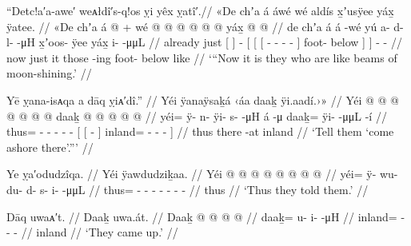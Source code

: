 \ex\label{ex:89-84-them-like-moonbeams}%
%
\begingl
	\glpreamble	“Detc!a′a-awe′ weᴀłdî′s-q!os ỵi yêx ỵatî′.//
	\glpreamble	«\!De chʼa á áwé wé aldís x̱ʼusÿee yáx̱ ÿatee. //
	\gla	«\!De chʼa {} á {}  @ {} +
		{} {} wé {}  @ {} @ {} @ {} @ {} @ {} {}
			 @ {} {} yáx̱ {}
		 @ {} @ {} //
	\glb	\pqp{}de chʼa {} á {} á -wé
		{} {} yú {} a- d- l-  -μH {} {}
			x̱ʼoos- ÿee {} yáx̱ {}
		i-  -μμL //
	\glc	\pqp{}already just {}[  {}]  -
		{}[ {}[  {}[ - - -  - \· {}]
			foot- below {}]  {}]
		-  - //
	\gld	\pqp{}now just {} it {}  {}
		{} {} those {}  {} {} {} {} -ing {}
			foot- below {} like {}
		 {} {} //
	\glft	‘“Now it is they who are like beams of moon-shining.’
		//
\endgl
\xe

\ex\label{ex:89-85-them-like-moonbeams}%
%
\begingl
	\glpreamble	Yē ỵana-isᴀqa a dāq ỵiᴀ′dî.” //
	\glpreamble	Yéi ÿanaÿsaḵá ‹\!áa daaḵ ÿi.aadí.\!›\!» //
	\gla	Yéi @  @ {} @ {} @ {} @ {} @ {}
		{} {}  @ {} {} daaḵ @  @ {} @ {} @ {} @ {} {} //
	\glb	yéi= ÿ- n- ÿi- s-  -μH
		{} {} á -μ {}
			daaḵ= ÿi-  -μμL -í {} //
	\glc	thus= - - - -  -
		{}[ {}[  - {}]
			inland= \· -  - - {}] //
	\gld	thus  {} {} {} {} {}
		{} {} there -at {}
			inland  {} {} {} {} {} //
	\glft	‘Tell them ‘come ashore there’.”’
		//
\endgl
\xe

\ex\label{ex:89-86-thus-they-told-them}%
%
\begingl
	\glpreamble	Ye ỵa′odudzîqa. //
	\glpreamble	Yéi ÿawdudziḵaa. //
	\gla	Yéi @  @ {} @ {} @ {} @ {} @ {} @ {} @ {} //
	\glb	yéi= ÿ- wu- du- d- s- i-  -μμL //
	\glc	thus= - - - - - -  - //
	\gld	thus  {} {} {} {} {} {} {} //
	\glft	‘Thus they told them.’
		//
\endgl
\xe

\ex\label{ex:89-87-came-up}%
%
\begingl
	\glpreamble	Dāq uwaᴀ′t. //
	\glpreamble	Daaḵ uwa.át. //
	\gla	Daaḵ @  @ {} @ {} @ {} //
	\glb	daaḵ= u- i-  -μH //
	\glc	inland= - -  - //
	\gld	inland  {} {} {} //
	\glft	‘They came up.’
		//
\endgl
\xe

